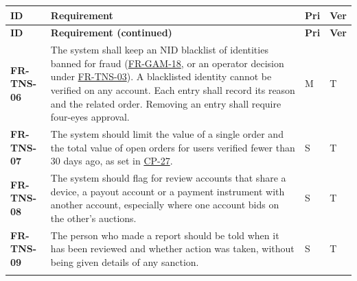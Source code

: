 \documentclass[11pt,a4paper]{report}
\makeatletter
\newenvironment{reqs}{%
  \small
  \begin{longtable}{@{}>{\raggedright\arraybackslash}p{2.35cm}
                       >{\raggedright\arraybackslash}p{10.3cm}
                       >{\centering\arraybackslash}p{0.7cm}
                       >{\centering\arraybackslash}p{0.7cm}@{}}
  \toprule
  \textbf{ID} & \textbf{Requirement} & \textbf{Pri} & \textbf{Ver} \\
  \midrule
  \endfirsthead
  \toprule
  \textbf{ID} & \textbf{Requirement (continued)} & \textbf{Pri} & \textbf{Ver} \\
  \midrule
  \endhead
  \bottomrule
  \endfoot
}{\end{longtable}}
\newcommand{\req}[5]{\leavevmode\textbf{#1}\hypertarget{#1}{} & #5 & #2 & #3 \\ \addlinespace[2pt]}
\newcommand{\rr}[1]{\hyperlink{#1}{#1}}
\newcommand{\cp}[1]{\hyperlink{#1}{#1}}
\makeatother
\begin{document}
\begin{reqs}
\req{FR-TNS-06}{M}{T}{new}{The system shall keep an NID blacklist of identities banned for fraud (\rr{FR-GAM-18}, or an operator decision under \rr{FR-TNS-03}). A blacklisted identity cannot be verified on any account. Each entry shall record its reason and the related order. Removing an entry shall require four-eyes approval.}
\req{FR-TNS-07}{S}{T}{new}{The system should limit the value of a single order and the total value of open orders for users verified fewer than 30 days ago, as set in \cp{CP-27}.}
\req{FR-TNS-08}{S}{T}{new}{The system should flag for review accounts that share a device, a payout account or a payment instrument with another account, especially where one account bids on the other's auctions.}
\req{FR-TNS-09}{S}{T}{new}{The person who made a report should be told when it has been reviewed and whether action was taken, without being given details of any sanction.}
\end{reqs}
\end{document}
